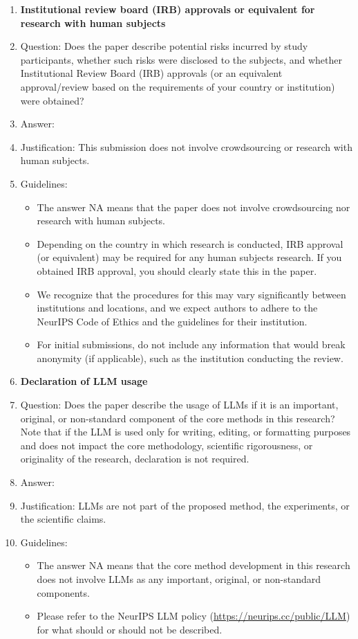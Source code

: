 \documentclass{article}
\begin{document}
\begin{enumerate}
\item {\bf Institutional review board (IRB) approvals or equivalent for research with human subjects}
    \item[] Question: Does the paper describe potential risks incurred by study participants, whether such risks were disclosed to the subjects, and whether Institutional Review Board (IRB) approvals (or an equivalent approval/review based on the requirements of your country or institution) were obtained?
    \item[] Answer: \answerNA{}
    \item[] Justification: This submission does not involve crowdsourcing or research with human subjects.
    \item[] Guidelines:
    \begin{itemize}
        \item The answer NA means that the paper does not involve crowdsourcing nor research with human subjects.
        \item Depending on the country in which research is conducted, IRB approval (or equivalent) may be required for any human subjects research. If you obtained IRB approval, you should clearly state this in the paper. 
        \item We recognize that the procedures for this may vary significantly between institutions and locations, and we expect authors to adhere to the NeurIPS Code of Ethics and the guidelines for their institution. 
        \item For initial submissions, do not include any information that would break anonymity (if applicable), such as the institution conducting the review.
    \end{itemize}

\item {\bf Declaration of LLM usage}
    \item[] Question: Does the paper describe the usage of LLMs if it is an important, original, or non-standard component of the core methods in this research? Note that if the LLM is used only for writing, editing, or formatting purposes and does not impact the core methodology, scientific rigorousness, or originality of the research, declaration is not required.
    \item[] Answer: \answerNA{}
    \item[] Justification: LLMs are not part of the proposed method, the experiments, or the scientific claims.
    \item[] Guidelines:
    \begin{itemize}
        \item The answer NA means that the core method development in this research does not involve LLMs as any important, original, or non-standard components.
        \item Please refer to the NeurIPS LLM policy (\url{https://neurips.cc/public/LLM}) for what should or should not be described.
    \end{itemize}

\end{enumerate}
\end{document}
